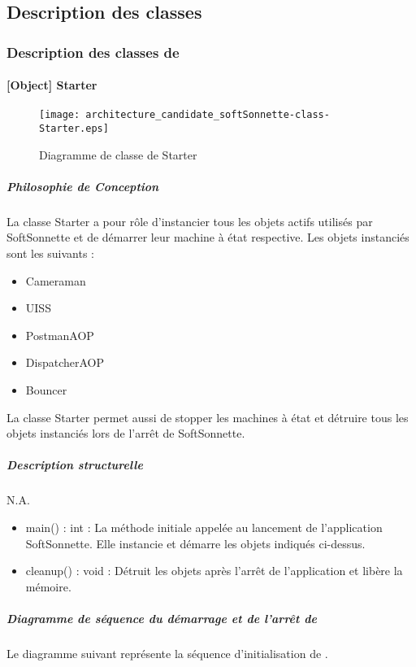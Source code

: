 \newpage

\subsection{Description des classes}

\subsubsection{Description des classes de \appliLin}%

    \paragraph{[Object] Starter}%

        \begin{figure} [H]
            \centering
            \texttt{[image: architecture\_candidate\_softSonnette-class-Starter.eps]}
            \caption{Diagramme de classe de Starter}
            \label{Classe-Starter}
        \end{figure}
    
        \subparagraph{Philosophie de Conception}%

        La classe Starter a pour rôle d'instancier tous les objets actifs utilisés par SoftSonnette et de démarrer leur machine à état respective.
        Les objets instanciés sont les suivants : 

        \begin{itemize}
            \item {Cameraman}
            \item {UISS}
            \item {PostmanAOP}
            \item {DispatcherAOP}
            \item {Bouncer}
        \end{itemize}

        La classe Starter permet aussi de stopper les machines à état et détruire tous les objets instanciés lors de l'arrêt de SoftSonnette.
        
        \subparagraph{Description structurelle}%

            N.A.
            \begin{itemize}
                \item {main() : int : La méthode initiale appelée au lancement de l'application SoftSonnette. Elle instancie et démarre les objets indiqués ci-dessus.}
                \item {cleanup() : void : Détruit les objets après l'arrêt de l'application et libère la mémoire.}
            \end{itemize}
\newpage
        \subparagraph{Diagramme de séquence du démarrage et de l'arrêt de \appliLin}%
        Le diagramme suivant représente la séquence d'initialisation de \appliLin.

